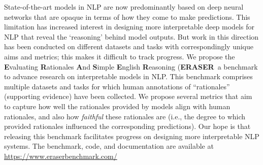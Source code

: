 State-of-the-art models in NLP are now predominantly based on deep neural networks that are opaque in terms of how they come to make predictions. This limitation has increased interest in designing more interpretable deep models for NLP that reveal the `reasoning' behind model outputs. But work in this direction has been conducted on different datasets and tasks with correspondingly unique aims and metrics; this makes it difficult to track progress. We propose the {\bf E}valuating {\bf R}ationales {\bf A}nd {\bf S}imple {\bf E}nglish {\bf R}easoning ({\bf ERASER}\, a benchmark to advance research on interpretable models in NLP. This benchmark comprises multiple datasets and tasks for which human annotations of ``rationales'' (supporting evidence) have been collected. We propose several metrics that aim to capture how well the rationales provided by models align with human rationales, and also how \emph{faithful} these rationales are (i.e., the degree to which provided rationales influenced the corresponding predictions). Our hope is that releasing this benchmark facilitates progress on designing more interpretable NLP systems. The benchmark, code, and documentation are available at \url{https://www.eraserbenchmark.com/}
